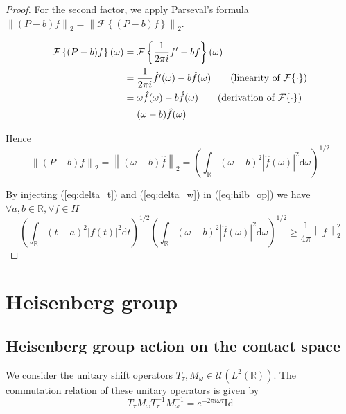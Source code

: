 \documentclass[
  american,
]{article}
\begin{document}
\begin{proof}
For the second factor, we apply Parseval's formula
\(\left\lVert(P-b)f\right\rVert_2 = \left\lVert\mathcal{F}\left\{(P-b)f\right\}\right\rVert_2\).

\begin{align*}
\mathcal{F}\left\{(P-b)f\right\}(\omega) &= \mathcal{F}\left\{\frac{1}{2\pi i}f' - bf\right\}(\omega)\\
    &= \frac{1}{2\pi i}\hat{f'}(\omega) - b\hat{f}(\omega)\tag{linearity of $\mathcal{F}\{\cdot\}$}\\
    &= \omega\hat{f}(\omega) - b\hat{f}(\omega)\tag{derivation of $\mathcal{F}\{\cdot\}$}\\
    &= (\omega-b)\hat{f}(\omega)
\end{align*}

Hence
\begin{equation}\label{eq:delta_w}
\left\lVert(P-b)f\right\rVert_2 = \left\lVert(\omega-b)\hat{f}\right\rVert_2
= \left(\int_\mathbb{R}(\omega-b)^2\left\lvert\hat{f}(\omega)\right\rvert^2\mathrm{d}\omega\right)^{1/2}
\end{equation}

By injecting (\ref{eq:delta_t}) and (\ref{eq:delta_w}) in (\ref{eq:hilb_op})
we have \(\forall a,b\in\mathbb{R},\forall f\in H\)
\begin{equation}
\left(\int_\mathbb{R}(t-a)^2\left\lvert f(t)\right\rvert^2\mathrm{d}t\right)^{1/2}
\left(\int_\mathbb{R}(\omega-b)^2\left\lvert\hat{f}(\omega)\right\rvert^2\mathrm{d}\omega\right)^{1/2}
\geq \frac{1}{4\pi}\left\lVert f\right\rVert_2^2
\end{equation}
\end{proof}

\hypertarget{heisenberg}{%
\section{Heisenberg group}\label{heisenberg}}

\hypertarget{heisenberg-group-action-on-the-contact-space}{%
\subsection{Heisenberg group action on the contact space}\label{heisenberg-group-action-on-the-contact-space}}

We consider the unitary shift operators \(T_\tau,M_\omega\in\mathcal{U}(L^2(\mathbb{R}))\).
The commutation relation of these unitary operators is given by
\begin{equation}
T_\tau M_\omega T_\tau^{-1} M_\omega^{-1} = e^{-2\pi i\omega\tau} \mathrm{Id}
\end{equation}
\end{document}
